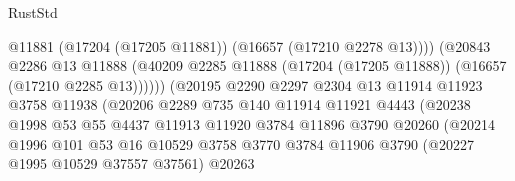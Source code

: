 \begin{lexlean}{RustStd}
\begin{coremodule}
                                            @11881
                                            (@17204 (@17205 @11881))
                                            (@16657 (@17210 @2278 @13))))
                                        (@20843
                                          @2286
                                          @13
                                          @11888
                                          (@40209
                                            @2285
                                            @11888
                                            (@17204 (@17205 @11888))
                                            (@16657 (@17210 @2285 @13))))))
                                    (@20195
                                      @2290
                                      @2297
                                      @2304
                                      @13
                                      @11914
                                      @11923
                                      @3758
                                      @11938
                                      (@20206
                                        @2289
                                        @735
                                        @140
                                        @11914
                                        @11921
                                        @4443
                                        (@20238
                                          @1998
                                          @53
                                          @55
                                          @4437
                                          @11913
                                          @11920
                                          @3784
                                          @11896
                                          @3790
                                          @20260
                                          (@20214
                                            @1996
                                            @101
                                            @53
                                            @16
                                            @10529
                                            @3758
                                            @3770
                                            @3784
                                            @11906
                                            @3790
                                            (@20227 @1995 @10529 @37557 @37561)
                                            @20263

\end{coremodule}
\end{lexlean}
